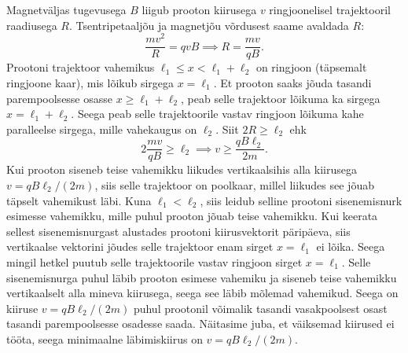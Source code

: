 Magnetväljas tugevusega $B$ liigub prooton kiirusega $v$ ringjoonelisel trajektooril raadiusega $R$. Tsentripetaaljõu ja magnetjõu võrdusest saame avaldada $R$:
\[\frac{mv^2}{R}=qvB\implies R=\frac{mv}{qB}.\]
Prootoni trajektoor vahemikus $\ell_1\leq x < \ell_1+\ell_2$ on ringjoon (täpsemalt ringjoone kaar), mis lõikub sirgega $x=\ell_1$. Et prooton saaks jõuda tasandi parempoolsesse osasse $x\geq \ell_1+\ell_2$, peab selle trajektoor lõikuma ka sirgega $x=\ell_1+\ell_2$. Seega peab selle trajektoorile vastav ringjoon lõikuma kahe paralleelse sirgega, mille vahekaugus on $\ell_2$. Siit $2R \geq \ell_2$ ehk
\[2\frac{mv}{qB}\geq \ell_2\implies v\geq \frac{qB\ell_2}{2m}.\]
Kui prooton siseneb teise vahemikku liikudes vertikaalsihis alla kiirusega $v= qB\ell_2/(2m)$, siis selle trajektoor on poolkaar, millel liikudes see jõuab täpselt vahemikust läbi. Kuna $\ell_1<\ell_2$, siis leidub selline prootoni sisenemisnurk esimesse vahemikku, mille puhul prooton jõuab teise vahemikku. Kui keerata sellest sisenemisnurgast alustades prootoni kiirusvektorit päripäeva, siis vertikaalse vektorini jõudes selle trajektoor enam sirget $x=\ell_1$ ei lõika. Seega mingil hetkel puutub selle trajektoorile vastav ringjoon sirget $x=\ell_1$. Selle sisenemisnurga puhul läbib prooton esimese vahemiku ja siseneb teise vahemikku vertikaalselt alla mineva kiirusega, seega see läbib mõlemad vahemikud. Seega on kiiruse $v= qB\ell_2/(2m)$ puhul prootonil võimalik tasandi vasakpoolsest osast tasandi parempoolsesse osadesse saada. Näitasime juba, et väiksemad kiirused ei tööta, seega minimaalne läbimiskiirus on $v= qB\ell_2/(2m)$.

